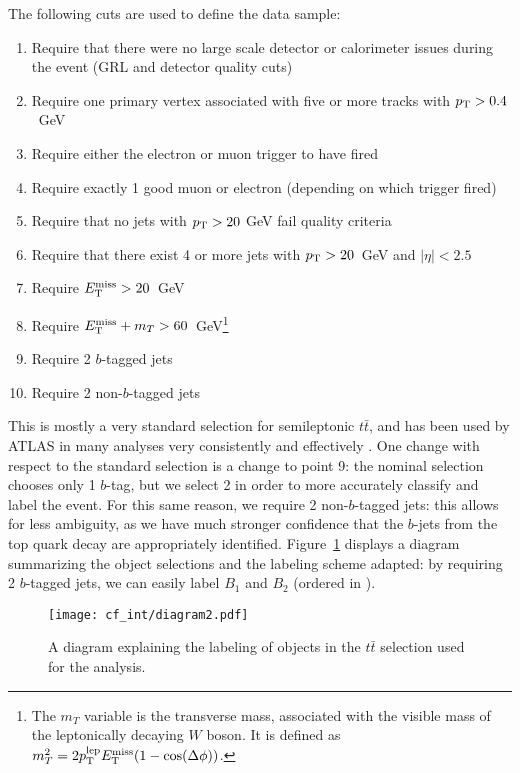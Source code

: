 The following cuts are used to define the data sample:
%
\begin{enumerate}
\item Require that there were no large scale detector or calorimeter issues during the event (GRL and detector quality cuts)
\item Require one primary vertex associated with five or more tracks with $p_{\text{T}} > 0.4$~GeV
\item Require either the electron or muon trigger to have fired
\item Require exactly 1 good muon or electron (depending on which trigger fired)
\item Require that no jets with $p_{\text{T}} > 20$ GeV fail quality criteria
\item Require that there exist 4 or more jets with $p_{\text{T}} > 20$~GeV and $|\eta| < 2.5$
\item Require $E_{\text{T}}^{\text{miss}} > 20$~GeV
\item Require $E_{\text{T}}^{\text{miss}} + m_T > 60$~GeV\footnote{The $m_T$ variable is the transverse mass, associated with the visible mass of the leptonically decaying $W$ boson. It is defined as $m_T^2 = 2 p_{\text{T}}^{\mathrm{lep}} E_{\text{T}}^{\text{miss}} (1 - \cos(\Delta \phi))$.}
\item Require 2 $b$-tagged jets
\item Require 2 non-$b$-tagged jets
\end{enumerate}
%
This is mostly a very standard selection for semileptonic $t\bar{t}$, and has been used by ATLAS in many analyses very consistently and effectively . One change with respect to the standard selection is a change to point 9: the nominal selection chooses only 1 $b$-tag, but we select 2 in order to more accurately classify and label the event. For this same reason, we require 2 non-$b$-tagged jets: this allows for less ambiguity, as we have much stronger confidence that the $b$-jets from the top quark decay are appropriately identified. Figure~\ref{fig:color:selection:labeling_diagram} displays a diagram summarizing the object selections and the labeling scheme adapted: by requiring 2 $b$-tagged jets, we can easily label $B_1$ and $B_2$ (ordered in \pt).


\begin{figure}
\centering
\texttt{[image: cf\_int/diagram2.pdf]}
\label{fig:color:selection:labeling_diagram}
\caption{A diagram explaining the labeling of objects in the $t\bar{t}$ selection used for the analysis.}
\end{figure}

